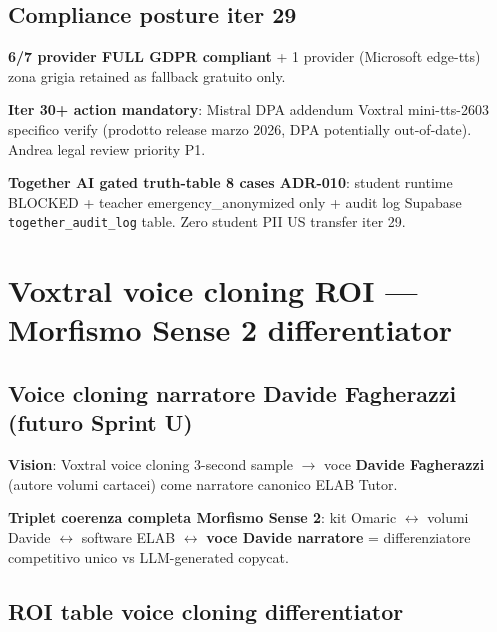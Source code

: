 \documentclass[12pt,a4paper]{article}
\begin{document}
\subsection{Compliance posture iter 29}

\textbf{6/7 provider FULL GDPR compliant} + 1 provider (Microsoft edge-tts) zona grigia retained as fallback gratuito only.

\textbf{Iter 30+ action mandatory}: Mistral DPA addendum Voxtral mini-tts-2603 specifico verify (prodotto release marzo 2026, DPA potentially out-of-date). Andrea legal review priority P1.

\textbf{Together AI gated truth-table 8 cases ADR-010}: student runtime BLOCKED + teacher emergency_anonymized only + audit log Supabase \texttt{together\_audit\_log} table. Zero student PII US transfer iter 29.

\newpage

\section{Voxtral voice cloning ROI --- Morfismo Sense 2 differentiator}

\subsection{Voice cloning narratore Davide Fagherazzi (futuro Sprint U)}

\textbf{Vision}: Voxtral voice cloning 3-second sample $\rightarrow$ voce \textbf{Davide Fagherazzi} (autore volumi cartacei) come narratore canonico ELAB Tutor.

\textbf{Triplet coerenza completa Morfismo Sense 2}: kit Omaric $\leftrightarrow$ volumi Davide $\leftrightarrow$ software ELAB $\leftrightarrow$ \textbf{voce Davide narratore} = differenziatore competitivo unico vs LLM-generated copycat.

\subsection{ROI table voice cloning differentiator}
\end{document}
